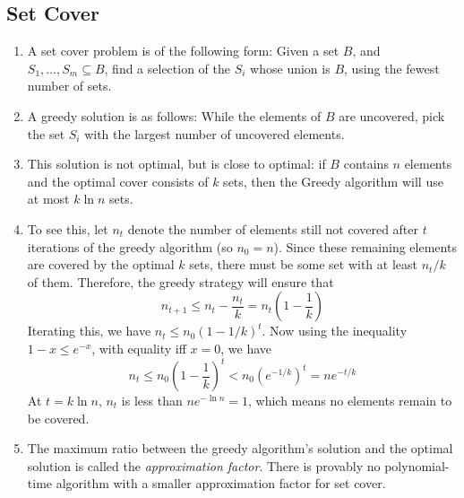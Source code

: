\documentclass[10pt]{article}
\begin{document}
\begin{multicols}{2}
\begin{addmargin}[0.8em]{0.5em}
    \subsection{Set Cover}
    \begin{enumerate}[label=(\alph*)]
        \item A set cover problem is of the following form: Given a set $B$, and $S_1, \hdots, S_m \subseteq B$, find a selection of the $S_i$ whose union is $B$, using the fewest number of sets.
        \item A greedy solution is as follows: While the elements of $B$ are uncovered, pick the set $S_i$ with the largest number of uncovered elements.
        \item This solution is not optimal, but is close to optimal: if $B$ contains $n$ elements and the optimal cover consists of $k$ sets, then the Greedy algorithm will use at most $k \ln{n}$ sets.
        \item To see this, let $n_t$ denote the number of elements still not covered after $t$ iterations of the greedy algorithm (so $n_0 = n$). Since these remaining elements are covered by the optimal $k$ sets, there must be some set with at least $n_t/k$ of them. Therefore, the greedy strategy will ensure that 
        $$
        n_{t+1} \leq n_t - \frac{n_t}{k} = n_t \left( 1 - \frac{1}{k} \right)
        $$
        Iterating this, we have $n_t \leq n_0 (1 - 1/k)^t$. Now using the inequality $1-x \leq e^{-x}$, with equality iff $x=0$, we have
        $$
        n_t \leq n_0 \left(1 - \frac{1}{k} \right)^t < n_0 (e^{-1/k})^t = ne^{-t/k}
        $$
        At $t=k\ln{n}$, $n_t$ is less than $ne^{-\ln{n}}=1$, which means no elements remain to be covered.
        \item The maximum ratio between the greedy algorithm’s solution and the optimal solution is called the \textit{approximation factor}. There is provably no polynomial-time algorithm with a smaller approximation factor for set cover.
    \end{enumerate}
    

\end{addmargin}
\end{multicols}
\end{document}
